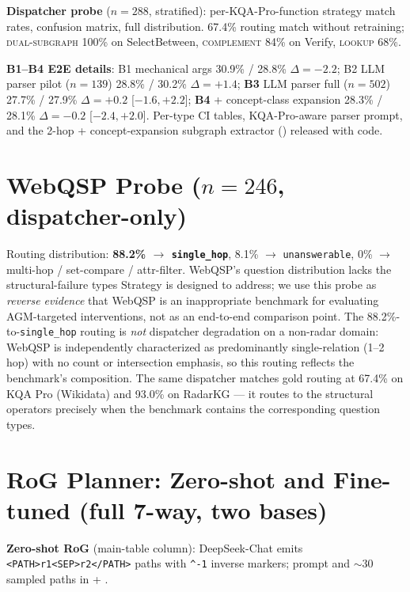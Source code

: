 \documentclass[11pt,a4paper]{article}
\newcommand{\qtype}[1]{\texttt{\small #1}}
\newcommand{\op}[1]{\textsc{\small #1}}
\begin{document}
\textbf{Dispatcher probe} ($n\!=\!288$, stratified): per-KQA-Pro-function strategy match rates, confusion matrix, full distribution. 67.4\% routing match without retraining; \op{dual-subgraph} 100\% on SelectBetween, \op{complement} 84\% on Verify, \op{lookup} 68\%.

\textbf{B1--B4 E2E details}: B1 mechanical args 30.9\% / 28.8\% $\Delta=-2.2$; B2 LLM parser pilot ($n\!=\!139$) 28.8\% / 30.2\% $\Delta=+1.4$; \textbf{B3} LLM parser full ($n\!=\!502$) 27.7\% / 27.9\% $\Delta=+0.2$ [$-1.6, +2.2$]; \textbf{B4} + concept-class expansion 28.3\% / 28.1\% $\Delta=-0.2$ [$-2.4, +2.0$]. Per-type CI tables, KQA-Pro-aware parser prompt, and the 2-hop + concept-expansion subgraph extractor () released with code.

\section{WebQSP Probe (\texorpdfstring{$n=246$}{n=246}, dispatcher-only)}
\label{app:webqsp}

Routing distribution: \textbf{88.2\% $\to$ \qtype{single\_hop}}, 8.1\% $\to$ \qtype{unanswerable}, 0\% $\to$ multi-hop / set-compare / attr-filter. WebQSP's question distribution lacks the structural-failure types Strategy is designed to address; we use this probe as \emph{reverse evidence} that WebQSP is an inappropriate benchmark for evaluating AGM-targeted interventions, not as an end-to-end comparison point. The 88.2\%-to-\qtype{single\_hop} routing is \emph{not} dispatcher degradation on a non-radar domain: WebQSP is independently characterized as predominantly single-relation (1--2 hop) with no count or intersection emphasis, so this routing reflects the benchmark's composition. The same dispatcher matches gold routing at 67.4\% on KQA Pro (Wikidata) and 93.0\% on RadarKG --- it routes to the structural operators precisely when the benchmark contains the corresponding question types.

\section{RoG Planner: Zero-shot and Fine-tuned (full 7-way, two bases)}
\label{app:rog}

\textbf{Zero-shot RoG} (main-table column): DeepSeek-Chat emits \texttt{<PATH>r1<SEP>r2</PATH>} paths with \texttt{\^{}-1} inverse markers; prompt and ${\sim}30$ sampled paths in  + .
\end{document}
